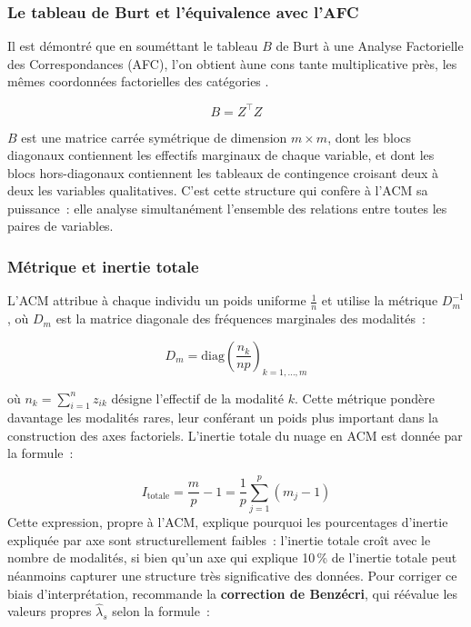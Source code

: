 \documentclass[12pt, a4paper, oneside]{report}
\begin{document}
\begin{enumerate}
	\subsubsection*{Le tableau de Burt et l'\'equivalence avec l'AFC}
	
	Il est démontré que en souméttant le tableau $B$ de Burt à une Analyse Factorielle des Correspondances (AFC), l'on obtient àune cons
	tante multiplicative près, les mêmes coordonnées factorielles des catégories \cite[chap.10, p.226]{saporta_2010}.
	
	\begin{equation}
		B = Z^{\top} Z
		\label{eq:burt}
	\end{equation}
	
	$B$ est une matrice carr\'ee sym\'etrique de dimension
	$m \times m$, dont les blocs diagonaux contiennent les
	effectifs marginaux de chaque variable, et dont les blocs
	hors-diagonaux contiennent les tableaux de contingence
	croisant deux \`a deux les variables qualitatives. C'est
	cette structure qui conf\`ere \`a l'ACM sa puissance~:
	elle analyse simultan\'ement l'ensemble des relations
	entre toutes les paires de variables.
	
	\subsubsection*{M\'etrique et inertie totale}
	
	L'ACM attribue \`a chaque individu un poids uniforme
	$\frac{1}{n}$ et utilise la m\'etrique $D_m^{-1}$, o\`u
	$D_m$ est la matrice diagonale des fr\'equences marginales
	des modalit\'es~:
	
	\begin{equation}
		D_m = \text{diag}\!\left(\frac{n_k}{np}\right)_{k=1,\ldots,m}
		\label{eq:metrique}
	\end{equation}
	
	o\`u $n_k = \sum_{i=1}^{n} z_{ik}$ d\'esigne l'effectif
	de la modalit\'e $k$. Cette m\'etrique pond\`ere davantage
	les modalit\'es rares, leur conf\'erant un poids plus
	important dans la construction des axes factoriels.
	L'inertie totale du
	nuage en ACM est donn\'ee par la formule~:
	
	\begin{equation}
		I_{\text{totale}} = \frac{m}{p} - 1
		= \frac{1}{p} \sum_{j=1}^{p} (m_j - 1)
		\label{eq:inertie_totale}
	\end{equation}
	\cite[chap.10, p.225]{saporta_2010}
	Cette expression, propre \`a l'ACM, explique pourquoi les
	pourcentages d'inertie expliqu\'ee par axe sont
	structurellement faibles~: l'inertie totale cro\^it avec
	le nombre de modalit\'es, si bien qu'un axe qui explique
	10\,\% de l'inertie totale peut n\'eanmoins capturer une
	structure tr\`es significative des donn\'ees. Pour
	corriger ce biais d'interpr\'etation, \cite{saporta_2010}
	recommande la \textbf{correction de Benz\'ecri}, qui
	r\'e\'evalue les valeurs propres $\hat{\lambda}_s$
	selon la formule~:
	

\end{enumerate}
\end{document}
